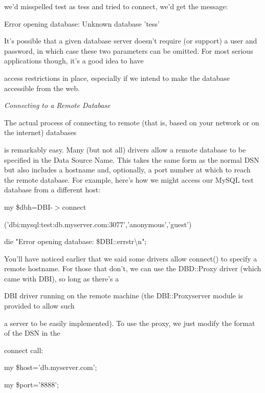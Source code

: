 \documentclass[a4paper,11pt]{book}
\begin{document}
\noindent we'd misspelled test as tess and tried to connect, we'd get the message:

\noindent 

\noindent Error opening database: Unknown database 'tess'

\noindent 

\noindent It's possible that a given database server doesn't require (or support) a user and password, in which case these two parameters can be omitted. For most serious applications though, it's a good idea to have

\noindent access restrictions in place, especially if we intend to make the database accessible from the web.

\noindent 

\noindent \textit{Connecting to a Remote Database}

\noindent The actual process of connecting to remote (that is, based on your network or on the internet) databases

\noindent is remarkably easy. Many (but not all) drivers allow a remote database to be specified in the Data Source Name. This takes the same form as the normal DSN but also includes a hostname and, optionally, a port number at which to reach the remote database. For example, here's how we might access our MySQL test database from a different host:

\noindent 

\noindent my \$dbh=DBI-$>$connect

\noindent ('dbi:mysql:test:db.myserver.com:3077','anonymous','guest')

\noindent \textbar \textbar  die "Error opening database: \$DBI::errstr\textbackslash n";

\noindent 

\noindent You'll have noticed earlier that we said some drivers allow connect() to specify a remote hostname. For those that don't, we can use the DBD::Proxy driver (which came with DBI), so long as there's a

\noindent DBI driver running on the remote machine (the DBI::Proxyserver module is provided to allow such

\noindent a server to be easily implemented). To use the proxy, we just modify the format of the DSN in the

\noindent connect call:

\noindent 

\noindent my \$host='db.myserver.com';

\noindent my \$port='8888';
\end{document}
